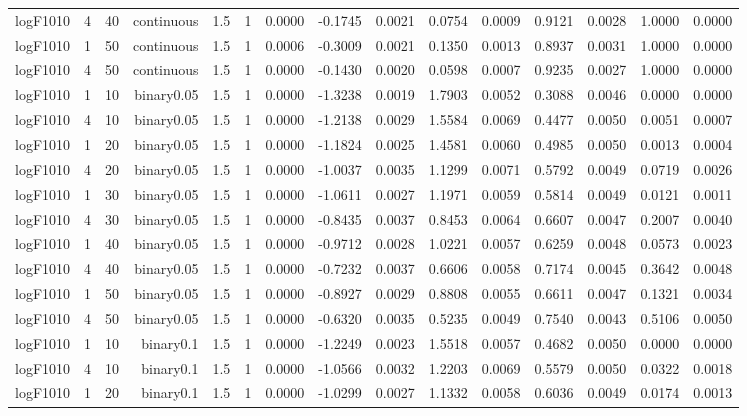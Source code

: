 \begin{longtable}{rrrrrrrrrrrrrrr}
  logF1010 & 4 & 40 & continuous & 1.5 & 1 & 0.0000 & -0.1745 & 0.0021 & 0.0754 & 0.0009 & 0.9121 & 0.0028 & 1.0000 & 0.0000 \\ 
  logF1010 & 1 & 50 & continuous & 1.5 & 1 & 0.0006 & -0.3009 & 0.0021 & 0.1350 & 0.0013 & 0.8937 & 0.0031 & 1.0000 & 0.0000 \\ 
  logF1010 & 4 & 50 & continuous & 1.5 & 1 & 0.0000 & -0.1430 & 0.0020 & 0.0598 & 0.0007 & 0.9235 & 0.0027 & 1.0000 & 0.0000 \\ 
  logF1010 & 1 & 10 & binary0.05 & 1.5 & 1 & 0.0000 & -1.3238 & 0.0019 & 1.7903 & 0.0052 & 0.3088 & 0.0046 & 0.0000 & 0.0000 \\ 
  logF1010 & 4 & 10 & binary0.05 & 1.5 & 1 & 0.0000 & -1.2138 & 0.0029 & 1.5584 & 0.0069 & 0.4477 & 0.0050 & 0.0051 & 0.0007 \\ 
  logF1010 & 1 & 20 & binary0.05 & 1.5 & 1 & 0.0000 & -1.1824 & 0.0025 & 1.4581 & 0.0060 & 0.4985 & 0.0050 & 0.0013 & 0.0004 \\ 
  logF1010 & 4 & 20 & binary0.05 & 1.5 & 1 & 0.0000 & -1.0037 & 0.0035 & 1.1299 & 0.0071 & 0.5792 & 0.0049 & 0.0719 & 0.0026 \\ 
  logF1010 & 1 & 30 & binary0.05 & 1.5 & 1 & 0.0000 & -1.0611 & 0.0027 & 1.1971 & 0.0059 & 0.5814 & 0.0049 & 0.0121 & 0.0011 \\ 
  logF1010 & 4 & 30 & binary0.05 & 1.5 & 1 & 0.0000 & -0.8435 & 0.0037 & 0.8453 & 0.0064 & 0.6607 & 0.0047 & 0.2007 & 0.0040 \\ 
  logF1010 & 1 & 40 & binary0.05 & 1.5 & 1 & 0.0000 & -0.9712 & 0.0028 & 1.0221 & 0.0057 & 0.6259 & 0.0048 & 0.0573 & 0.0023 \\ 
  logF1010 & 4 & 40 & binary0.05 & 1.5 & 1 & 0.0000 & -0.7232 & 0.0037 & 0.6606 & 0.0058 & 0.7174 & 0.0045 & 0.3642 & 0.0048 \\ 
  logF1010 & 1 & 50 & binary0.05 & 1.5 & 1 & 0.0000 & -0.8927 & 0.0029 & 0.8808 & 0.0055 & 0.6611 & 0.0047 & 0.1321 & 0.0034 \\ 
  logF1010 & 4 & 50 & binary0.05 & 1.5 & 1 & 0.0000 & -0.6320 & 0.0035 & 0.5235 & 0.0049 & 0.7540 & 0.0043 & 0.5106 & 0.0050 \\ 
  logF1010 & 1 & 10 & binary0.1 & 1.5 & 1 & 0.0000 & -1.2249 & 0.0023 & 1.5518 & 0.0057 & 0.4682 & 0.0050 & 0.0000 & 0.0000 \\ 
  logF1010 & 4 & 10 & binary0.1 & 1.5 & 1 & 0.0000 & -1.0566 & 0.0032 & 1.2203 & 0.0069 & 0.5579 & 0.0050 & 0.0322 & 0.0018 \\ 
  logF1010 & 1 & 20 & binary0.1 & 1.5 & 1 & 0.0000 & -1.0299 & 0.0027 & 1.1332 & 0.0058 & 0.6036 & 0.0049 & 0.0174 & 0.0013 \\ 

\end{longtable}
